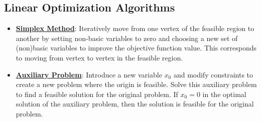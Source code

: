 \documentclass{article}%
\begin{document}
\subsection{Linear Optimization Algorithms}%
\label{subsec:LinearOptimizationAlgorithms}%
\begin{itemize}[leftmargin=*]%
\item \href{https://www.math.purdue.edu/~yipn/421/2024-08-27-ExSimplex.pdf#page=6}{\textbf{Simplex Method}}: Iteratively move from one vertex of the feasible region to another by setting non-basic variables to zero and choosing a new set of (non)basic variables to improve the objective function value. This corresponds to moving from vertex to vertex in the feasible region.%
\item \href{https://www.math.purdue.edu/~yipn/421/2024-08-27-ExSimplex.pdf#page=32}{\textbf{Auxiliary Problem}}: Introduce a new variable $x_0$ and modify constraints to create a new problem where the origin is feasible. Solve this auxiliary problem to find a feasible solution for the original problem. If $x_0 = 0$ in the optimal solution of the auxiliary problem, then the solution is feasible for the original problem.%
\end{itemize}

%
\end{document}
